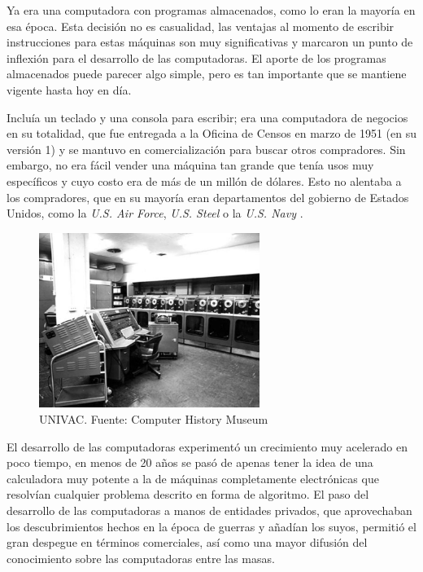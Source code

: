 \documentclass[letterpaper,12pt,oneside]{book}
\begin{document}
		Ya era una computadora con programas almacenados, como lo eran la mayoría en esa época. Esta decisión no es casualidad, las
		ventajas al momento de escribir instrucciones para estas máquinas son muy significativas y marcaron un punto de inflexión para el desarrollo de las computadoras.
		El aporte de los programas almacenados puede parecer algo simple, pero es tan importante  que se mantiene vigente hasta hoy en día.
  
        Incluía un teclado y una 
		consola para escribir; era una computadora de negocios en su totalidad, que
		fue entregada a la Oficina de Censos en marzo de 1951 (en su versión 1) y se mantuvo en comercialización para buscar otros compradores. Sin embargo, no era  fácil 
		vender una máquina
		tan grande que tenía usos muy específicos y cuyo costo era de más de un millón de dólares. Esto no alentaba a los compradores, que en su mayoría
		eran departamentos del gobierno de Estados Unidos, como la \textit{U.S. Air Force}, \textit{U.S. Steel} o la \textit{U.S. Navy} \cite[p.43]{oregan_brief_2012}.
		
		
		\begin{figure}
		    \centering
		    \includegraphics[width=0.64\textwidth]{media/Historia/CHM_computers_1951.univacI.jpg}
		    \caption{UNIVAC. Fuente: Computer History Museum}
	    	\label{fig:univac1}
		\end{figure}
		
		

		
		El desarrollo de las computadoras experimentó un crecimiento muy acelerado en poco tiempo, en menos de 20 años se pasó de apenas tener la idea
		de una calculadora muy potente a la de máquinas completamente electrónicas que resolvían cualquier problema
		descrito en forma de algoritmo. El paso del desarrollo de las computadoras a manos de entidades privados, que aprovechaban los
descubrimientos hechos en la época de guerras y añadían los suyos, permitió
el gran despegue en términos comerciales, así como una mayor difusión del conocimiento sobre las computadoras entre las masas.
  
\end{document}

